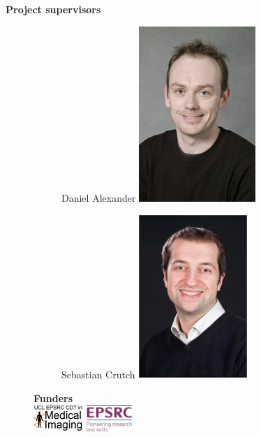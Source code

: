 \documentclass[8pt,xcolor=table]{beamer}
\begin{document}
\begin{frame}
\begin{small}
\begin{columns}[T]
    
    \begin{column}{.45\textwidth}
    \begin{center}
    \textbf{Project supervisors}
    \end{center}
    \vspace{-2em}
      \begin{figure}
      \begin{subfigure}{0.45\textwidth}
      \centering
      Daniel Alexander
      \includegraphics[scale=0.25]{Danny-Alexander.jpeg}  
      \end{subfigure}
	\begin{subfigure}{0.45\textwidth}
	\centering
	Sebastian Crutch
      \includegraphics[scale=0.27]{Seb_Crutch_photo.JPG}  
      \end{subfigure}
      
      \vspace{2em}

	\textbf{Funders}\\
	\vspace{1em}
	\includegraphics[height=1.0cm]{CDTlogo.png} \hspace{1em} \includegraphics[height=1.0cm]{epsrc_logo.jpg}


\end{figure}
\end{column}
\end{columns}
\end{small}
\end{frame}
\end{document}
